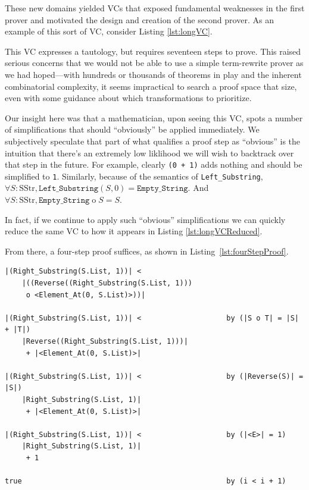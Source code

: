 These new domains yielded VCs that exposed fundamental weaknesses in the first prover and motivated the design and creation of the second prover.  As an example of this sort of VC, consider Listing \ref{lst:longVC}.



This VC expresses a tautology, but requires seventeen steps to prove.  This raised serious concerns that we would not be able to use a simple term-rewrite prover as we had hoped---with hundreds or thousands of theorems in play and the inherent combinatorial complexity, it seems impractical to search a proof space that size, even with some guidance about which transformations to prioritize.

Our insight here was that a mathematician, upon seeing this VC, spots a number of simplifications that should ``obviously'' be applied immediately.  We subjectively speculate that part of what qualifies a proof step as ``obvious'' is the intuition that there's an extremely low liklihood we will wish to backtrack over that step in the future.  For example, clearly \texttt{(0 + 1)} adds nothing and should be simplified to \texttt{1}.  Similarly, because of the semantics of \texttt{Left\_Substring}, $\forall S : \text{SStr}, \texttt{Left\_Substring}(S, 0) = \texttt{Empty\_String}$.  And $\forall S : \text{SStr}, \texttt{Empty\_String} \operatorname{o} S = S$.

In fact, if we continue to apply such ``obvious'' simplifications we can quickly reduce the same VC to how it appears in Listing \ref{lst:longVCReduced}.



From there, a four-step proof suffices, as shown in Listing~\ref{lst:fourStepProof}.

\begin{lstlisting}[float=h,language=resolve,caption={A straightforward proof of the requires clause of \texttt{Advance()}\label{lst:fourStepProof}}]
|(Right_Substring(S.List, 1))| < 
	|((Reverse((Right_Substring(S.List, 1)))
	 o <Element_At(0, S.List)>))|

|(Right_Substring(S.List, 1))| <                    by (|S o T| = |S| + |T|)
	|Reverse((Right_Substring(S.List, 1)))|
	 + |<Element_At(0, S.List)>|

|(Right_Substring(S.List, 1))| <                    by (|Reverse(S)| = |S|)
	|Right_Substring(S.List, 1)|
	 + |<Element_At(0, S.List)>|

|(Right_Substring(S.List, 1))| <                    by (|<E>| = 1)
	|Right_Substring(S.List, 1)|
	 + 1

true                                                by (i < i + 1)
\end{lstlisting}

